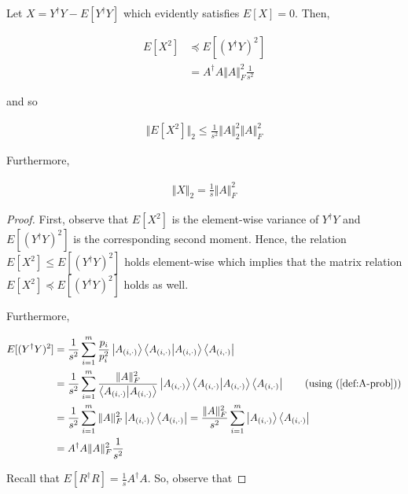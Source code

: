 \documentclass[main.tex]{subfiles}
\begin{document}
{\begin{lemma}
	Let $X = Y^\dag Y - E[Y^\dag Y]$ which evidently satisfies $E[X] = 0$. Then,
	
	\begin{align}
	E[X^2] &\preceq E[(Y^\dag Y)^2] \\
	&= A^\dag A \Vert A \Vert_F^2 \frac{1}{s^2}	
	\end{align}
	
	and so 
	
	\begin{align}
	\label{eq:expect-x-2}
	\Vert E[X^2] \Vert_2 \leq \frac{1}{s^2} \Vert A \Vert_2^2 \Vert A \Vert_F^2	
	\end{align}

	
	Furthermore,
	
	\begin{align}
	\Vert X \Vert_2 = \frac{1}{s} \Vert A \Vert^2_F	
	\end{align}
\begin{proof}
First, observe that $E[X^2]$ is the element-wise variance of $Y^\dag Y$ and $E[(Y^\dag Y)^2]$ is the corresponding second moment. Hence, the relation $E[X^2] \leq E[(Y^\dag Y)^2]$ holds element-wise which implies that the matrix relation $E[X^2] \preceq E[(Y^\dag Y)^2]$ holds as well.

Furthermore, 

\begin{align*}
E[(Y^\dag Y)^2] &= \frac{1}{s^2} \sum_{i = 1}^m \frac{p_{i}}{p_{i}^2} \ket{A_{(i, \cdot)}}\bra{A_{(i, \cdot)}}\ket{A_{(i, \cdot)}}\bra{A_{(i, \cdot)}} \\
&= \frac{1}{s^2} \sum_{i = 1}^m \frac{\Vert A \Vert_F^2}{\bra{A_{(i, \cdot)}}\ket{A_{(i, \cdot)}}} \ket{A_{(i, \cdot)}}\bra{A_{(i, \cdot)}}\ket{A_{(i, \cdot)}}\bra{A_{(i, \cdot)}}\tag{using (\ref{def:A-prob})}\\
&= \frac{1}{s^2} \sum_{i = 1}^m \Vert A \Vert_F^2 \ket{A_{(i, \cdot)}}\bra{A_{(i, \cdot)}} = \frac{\Vert A \Vert_F^2}{s^2} \sum_{i = 1}^m  \ket{A_{(i, \cdot)}}\bra{A_{(i, \cdot)}} \\
&= A^\dag A \Vert A \Vert_F^2 \frac{1}{s^2}	
\end{align*}

Recall that $E[R^\dag R] = \frac{1}{s} A^\dag A$. So, observe that


\end{proof}
\end{lemma}}
\end{document}
